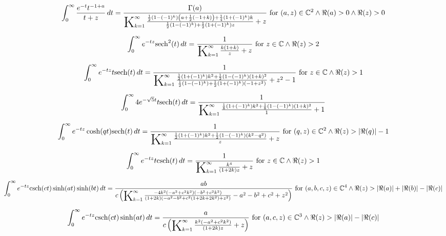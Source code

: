 \documentclass{article}
\newcommand{\bigK}{\mathop{\raisebox{-5pt}{\huge K}}}
\begin{document}
\[\int_0^{\infty } \frac{e^{-t} t^{-1+a}}{t+z} \, dt=\frac{\Gamma (a)}{\bigK_{k=1}^{\infty}\frac{\frac{1}{2} \left(1-(-1)^k\right) \left(a+\frac{1}{2} (-1+k)\right)+\frac{1}{4} \left(1+(-1)^k\right) k}{\frac{1}{2} \left(1-(-1)^k\right)+\frac{1}{2} \left(1+(-1)^k\right) z}+z}\text{ for }(a,z)\in \mathbb{C}^2\land \Re(a)>0\land \Re(z)>0\] 

\[\int_0^{\infty } e^{-t z} \text{sech}^2(t) \, dt=\frac{1}{\bigK_{k=1}^{\infty}\frac{k (1+k)}{z}+z}\text{ for }z\in \mathbb{C}\land \Re(z)>2\] 

\[\int_0^{\infty } e^{-t z} t \text{sech}(t) \, dt=\frac{1}{\bigK_{k=1}^{\infty}\frac{\frac{1}{2} \left(1+(-1)^k\right) k^2+\frac{1}{2} \left(1-(-1)^k\right) (1+k)^2}{\frac{1}{2} \left(1-(-1)^k\right)+\frac{1}{2} \left(1+(-1)^k\right) \left(-1+z^2\right)}+z^2-1}\text{ for }z\in \mathbb{C}\land \Re(z)>1\] 

\[\int_0^{\infty } 4 e^{-\sqrt{5} t} t \text{sech}(t) \, dt=\frac{1}{\bigK_{k=1}^{\infty}\frac{\frac{1}{8} \left(1+(-1)^k\right) k^2+\frac{1}{8} \left(1-(-1)^k\right) (1+k)^2}{1}+1}\] 

\[\int_0^{\infty } e^{-t z} \cosh (q t) \text{sech}(t) \, dt=\frac{1}{\bigK_{k=1}^{\infty}\frac{\frac{1}{2} \left(1+(-1)^k\right) k^2+\frac{1}{2} \left(1-(-1)^k\right) \left(k^2-q^2\right)}{z}+z}\text{ for }(q,z)\in \mathbb{C}^2\land \Re(z)>\left| \Re(q)\right| -1\] 

\[\int_0^{\infty } e^{-t z} t \text{csch}(t) \, dt=\frac{1}{\bigK_{k=1}^{\infty}\frac{k^4}{(1+2 k) z}+z}\text{ for }z\in \mathbb{C}\land \Re(z)>1\] 

\[\int_0^{\infty } e^{-t z} \text{csch}(c t) \sinh (a t) \sinh (b t) \, dt=\frac{a b}{c \left(\bigK_{k=1}^{\infty}\frac{-4 k^2 \left(-a^2+c^2 k^2\right) \left(-b^2+c^2 k^2\right)}{(1+2 k) \left(-a^2-b^2+c^2 \left(1+2 k+2 k^2\right)+z^2\right)}-a^2-b^2+c^2+z^2\right)}\text{ for }(a,b,c,z)\in \mathbb{C}^4\land \Re(z)>\left| \Re(a)\right| +\left| \Re(b)\right| -\left| \Re(c)\right|\] 

\[\int_0^{\infty } e^{-t z} \text{csch}(c t) \sinh (a t) \, dt=\frac{a}{c \left(\bigK_{k=1}^{\infty}\frac{k^2 \left(-a^2+c^2 k^2\right)}{(1+2 k) z}+z\right)}\text{ for }(a,c,z)\in \mathbb{C}^3\land \Re(z)>\left| \Re(a)\right| -\left| \Re(c)\right|\] 
\end{document}
